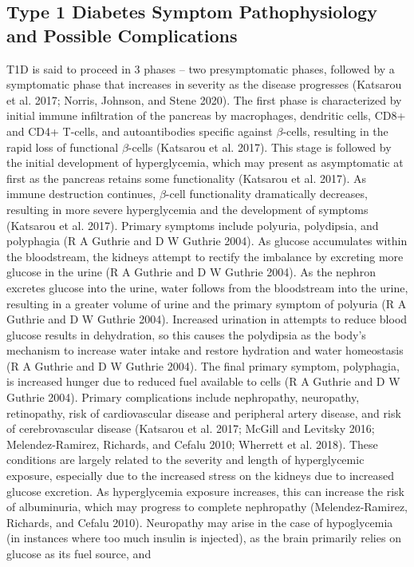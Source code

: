 \documentclass{article}
\begin{document}
\subsection{Type 1 Diabetes Symptom Pathophysiology and Possible Complications}
T1D is said to proceed in 3 phases – two presymptomatic phases, followed by a symptomatic phase that increases in
severity as the disease progresses (Katsarou et al. 2017; Norris, Johnson, and Stene 2020). The first phase is characterized
by initial immune infiltration of the pancreas by macrophages, dendritic cells, CD8+ and CD4+ T-cells, and autoantibodies
specific against $\beta$-cells, resulting in the rapid loss of functional $\beta$-cells (Katsarou et al. 2017). This stage is followed by the initial development of hyperglycemia, which may present as asymptomatic at first as the pancreas retains some functionality (Katsarou et al. 2017). As immune destruction continues, $\beta$-cell functionality dramatically decreases, resulting in more severe hyperglycemia and the development of symptoms (Katsarou et al. 2017). Primary symptoms include polyuria, polydipsia, and polyphagia (R A Guthrie and D W Guthrie 2004). As glucose accumulates within the bloodstream, the kidneys attempt to
rectify the imbalance by excreting more glucose in the urine (R A Guthrie and D W Guthrie 2004). As the nephron excretes
glucose into the urine, water follows from the bloodstream into the urine, resulting in a greater volume of urine and the primary
symptom of polyuria (R A Guthrie and D W Guthrie 2004). Increased urination in attempts to reduce blood glucose results
in dehydration, so this causes the polydipsia as the body’s mechanism to increase water intake and restore hydration and
water homeostasis (R A Guthrie and D W Guthrie 2004). The final primary symptom, polyphagia, is increased hunger due to
reduced fuel available to cells (R A Guthrie and D W Guthrie 2004). Primary complications include nephropathy, neuropathy,
retinopathy, risk of cardiovascular disease and peripheral artery disease, and risk of cerebrovascular disease (Katsarou et al.
2017; McGill and Levitsky 2016; Melendez-Ramirez, Richards, and Cefalu 2010; Wherrett et al. 2018). These conditions
are largely related to the severity and length of hyperglycemic exposure, especially due to the increased stress on the kidneys
due to increased glucose excretion. As hyperglycemia exposure increases, this can increase the risk of albuminuria, which
may progress to complete nephropathy (Melendez-Ramirez, Richards, and Cefalu 2010). Neuropathy may arise in the case of
hypoglycemia (in instances where too much insulin is injected), as the brain primarily relies on glucose as its fuel source, and
\end{document}
